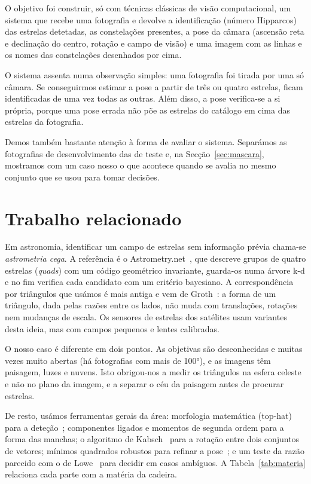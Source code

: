 \documentclass[11pt,a4paper]{article}
\begin{document}
O objetivo foi construir, só com técnicas clássicas de visão computacional,
um sistema que recebe uma fotografia e devolve a identificação (número
Hipparcos) das estrelas detetadas, as constelações presentes, a pose da
câmara (ascensão reta e declinação do centro, rotação e campo de visão) e uma
imagem com as linhas e os nomes das constelações desenhados por cima.

O sistema assenta numa observação simples: uma fotografia foi tirada por uma
só câmara. Se conseguirmos estimar a pose a partir de três ou quatro
estrelas, ficam identificadas de uma vez todas as outras. Além disso, a pose
verifica-se a si própria, porque uma pose errada não põe as estrelas do
catálogo em cima das estrelas da fotografia.

Demos também bastante atenção à forma de avaliar o sistema. Separámos as
fotografias de desenvolvimento das de teste e, na
Secção~\ref{sec:mascara}, mostramos com um caso nosso o que acontece quando
se avalia no mesmo conjunto que se usou para tomar decisões.

\section{Trabalho relacionado}

Em astronomia, identificar um campo de estrelas sem informação prévia chama-se
\emph{astrometria cega}. A referência é o Astrometry.net~\cite{lang2010}, que
descreve grupos de quatro estrelas (\emph{quads}) com um código geométrico
invariante, guarda-os numa árvore k-d e no fim verifica cada candidato com um
critério bayesiano. A correspondência por triângulos que usámos é mais antiga
e vem de Groth~\cite{groth1986}: a forma de um triângulo, dada pelas razões
entre os lados, não muda com translações, rotações nem mudanças de escala. Os
sensores de estrelas dos satélites usam variantes desta ideia, mas com campos
pequenos e lentes calibradas.

O nosso caso é diferente em dois pontos. As objetivas são desconhecidas e
muitas vezes muito abertas (há fotografias com mais de 100°), e as imagens têm
paisagem, luzes e nuvens. Isto obrigou-nos a medir os triângulos na esfera
celeste e não no plano da imagem, e a separar o céu da paisagem antes de
procurar estrelas.

De resto, usámos ferramentas gerais da área: morfologia matemática (top-hat)
para a deteção~\cite{gonzalez2018}; componentes ligados e momentos de segunda
ordem para a forma das manchas; o algoritmo de Kabsch~\cite{kabsch1976} para
a rotação entre dois conjuntos de vetores; mínimos quadrados robustos para
refinar a pose~\cite{szeliski2022}; e um teste da razão parecido com o de
Lowe~\cite{lowe2004} para decidir em casos ambíguos. A
Tabela~\ref{tab:materia} relaciona cada parte com a matéria da cadeira.
\end{document}
